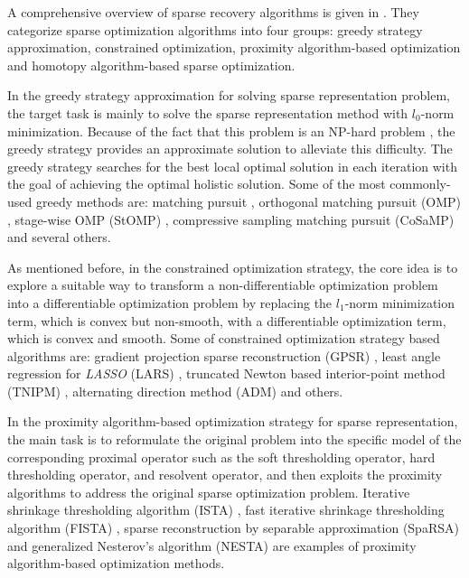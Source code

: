 \documentclass[journal]{IEEEtran}
\begin{document}
A comprehensive overview of sparse recovery algorithms is given in \cite{Zhang2015}. They categorize sparse optimization algorithms into four groups: greedy strategy approximation, constrained optimization, proximity algorithm-based optimization and homotopy algorithm-based sparse optimization. 

In the greedy strategy approximation for solving sparse representation problem, the target task is mainly to solve the sparse representation method with $l_0$-norm minimization. Because of the fact that this problem is an NP-hard problem , the greedy strategy provides an approximate solution to alleviate this difficulty. The greedy strategy searches for the best local optimal solution in each iteration with the goal of achieving the optimal holistic solution. Some of the most commonly-used greedy methods are: matching pursuit \cite{chen2001atomic}, orthogonal matching pursuit (OMP) \cite{pati1993orthogonal}, stage-wise OMP (StOMP) \cite{donoho2012sparse}, compressive sampling matching pursuit (CoSaMP) \cite{needell2009cosamp} and several others. 

As mentioned before, in the constrained optimization strategy, the core idea is to explore a suitable way to transform a non-differentiable optimization problem into a differentiable optimization problem by replacing the $l_1$-norm minimization term, which is convex but non-smooth, with a differentiable optimization term, which is convex and smooth. Some of constrained optimization strategy based algorithms are: gradient projection sparse reconstruction (GPSR) \cite{figueiredo2007gradient}, least angle regression for \textit{LASSO} (LARS) \cite{efron2004least}, truncated Newton based interior-point method (TNIPM) \cite{portugal2000truncated}, alternating direction method (ADM) \cite{yang2011alternating} and others.

In the proximity algorithm-based optimization strategy for sparse representation, the main task is to reformulate the original problem into the specific model of the corresponding proximal operator such as the soft thresholding operator, hard thresholding operator, and resolvent operator, and then exploits the proximity algorithms to address the original sparse optimization problem. Iterative shrinkage thresholding algorithm (ISTA) \cite{figueiredo2005bound}, fast iterative shrinkage thresholding algorithm (FISTA) \cite{beck2009fast}, sparse reconstruction by separable approximation (SpaRSA) \cite{Wright2009} and generalized Nesterov's algorithm (NESTA) \cite{becker2011nesta} are examples of proximity algorithm-based optimization methods.
\end{document}
